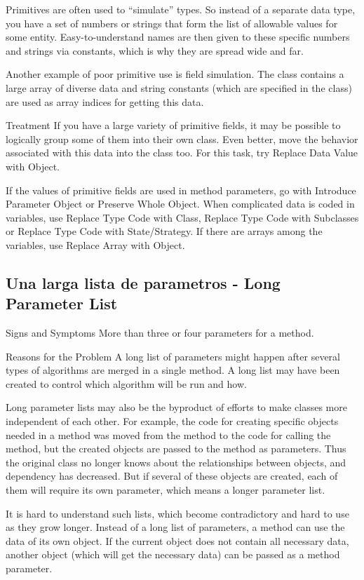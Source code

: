 \documentclass[11pt,a4paper,oneside]{book}
\begin{document}
Primitives are often used to “simulate” types. So instead of a separate data type, you have a set of numbers or strings that form the list of allowable values for some entity. Easy-to-understand names are then given to these specific numbers and strings via constants, which is why they are spread wide and far.

Another example of poor primitive use is field simulation. The class contains a large array of diverse data and string constants (which are specified in the class) are used as array indices for getting this data.

Treatment
If you have a large variety of primitive fields, it may be possible to logically group some of them into their own class. Even better, move the behavior associated with this data into the class too. For this task, try Replace Data Value with Object.

If the values of primitive fields are used in method parameters, go with Introduce Parameter Object or Preserve Whole Object.
When complicated data is coded in variables, use Replace Type Code with Class, Replace Type Code with Subclasses or Replace Type Code with State/Strategy.
If there are arrays among the variables, use Replace Array with Object.
\subsection{Una larga lista de parametros -   Long Parameter List}
\label{longparameterlist}

Signs and Symptoms
More than three or four parameters for a method.


Reasons for the Problem
A long list of parameters might happen after several types of algorithms are merged in a single method. A long list may have been created to control which algorithm will be run and how.

Long parameter lists may also be the byproduct of efforts to make classes more independent of each other. For example, the code for creating specific objects needed in a method was moved from the method to the code for calling the method, but the created objects are passed to the method as parameters. Thus the original class no longer knows about the relationships between objects, and dependency has decreased. But if several of these objects are created, each of them will require its own parameter, which means a longer parameter list.

It is hard to understand such lists, which become contradictory and hard to use as they grow longer. Instead of a long list of parameters, a method can use the data of its own object. If the current object does not contain all necessary data, another object (which will get the necessary data) can be passed as a method parameter.
\end{document}
